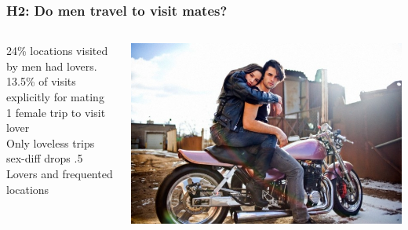 \documentclass{beamer}
\begin{document}
\begin{frame}
\frametitle{H2: Do men travel to visit mates?}

\begin{columns}
\begin{column}{.6\textwidth}
24\% locations visited by men had lovers. \\
\vspace{0.75cm} 
13.5\% of visits explicitly for mating \\
\vspace{0.75cm} 
1 female trip to visit lover \\
\vspace{0.75cm} 
Only loveless trips sex-diff drops .5 \\
\vspace{0.75cm} 
Lovers and frequented locations \\
\end{column}

\begin{column}{.4\textwidth}
\includegraphics[width=1\linewidth]{travelmate}
\end{column}

\end{columns}

\end{frame}



\end{document}
